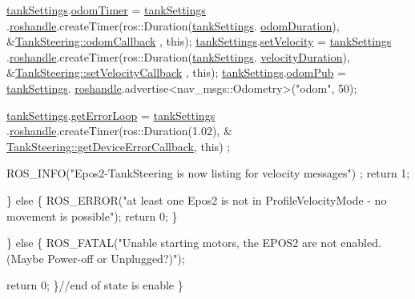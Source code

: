 \begin{DoxyCode}
            \hyperlink{classTankSteering_a6973af1afc00c9b11f32ecc7ad7e8a14}{tankSettings}.\hyperlink{structTankSteering_1_1tankSet_aa0c689559cc4b8217b66d752ed9c5514}{odomTimer} = \hyperlink{classTankSteering_a6973af1afc00c9b11f32ecc7ad7e8a14}{tankSettings}
      .\hyperlink{structTankSteering_1_1tankSet_a56100d71c75a60b1bee858cac36bd28b}{roshandle}.createTimer(ros::Duration(\hyperlink{classTankSteering_a6973af1afc00c9b11f32ecc7ad7e8a14}{tankSettings}.
      \hyperlink{structTankSteering_1_1tankSet_a9bef02225da9845d32bf5700ef132aba}{odomDuration}), &\hyperlink{classTankSteering_ae19dbe86e3ae541c06525af2721a37dd}{TankSteering::odomCallback}
      , \textcolor{keyword}{this});
            \hyperlink{classTankSteering_a6973af1afc00c9b11f32ecc7ad7e8a14}{tankSettings}.\hyperlink{structTankSteering_1_1tankSet_acbbb0676b14d02706ad100abee4a22c8}{setVelocity} = \hyperlink{classTankSteering_a6973af1afc00c9b11f32ecc7ad7e8a14}{tankSettings}
      .\hyperlink{structTankSteering_1_1tankSet_a56100d71c75a60b1bee858cac36bd28b}{roshandle}.createTimer(ros::Duration(\hyperlink{classTankSteering_a6973af1afc00c9b11f32ecc7ad7e8a14}{tankSettings}.
      \hyperlink{structTankSteering_1_1tankSet_a30ffc7283de96cfdf97cd987de2cad63}{velocityDuration}), &\hyperlink{classTankSteering_ab1335cf95b773d0b8908d74ebb61c289}{TankSteering::setVelocityCallback}
      , \textcolor{keyword}{this});
            \hyperlink{classTankSteering_a6973af1afc00c9b11f32ecc7ad7e8a14}{tankSettings}.\hyperlink{structTankSteering_1_1tankSet_a49304224faeac566fc964cbc98135499}{odomPub} = \hyperlink{classTankSteering_a6973af1afc00c9b11f32ecc7ad7e8a14}{tankSettings}.
      \hyperlink{structTankSteering_1_1tankSet_a56100d71c75a60b1bee858cac36bd28b}{roshandle}.advertise<nav\_msgs::Odometry>(\textcolor{stringliteral}{"odom"}, 50);

            \hyperlink{classTankSteering_a6973af1afc00c9b11f32ecc7ad7e8a14}{tankSettings}.\hyperlink{structTankSteering_1_1tankSet_a729f2d8c93ceca1feee6dd6c7680e85a}{getErrorLoop} = \hyperlink{classTankSteering_a6973af1afc00c9b11f32ecc7ad7e8a14}{tankSettings}
      .\hyperlink{structTankSteering_1_1tankSet_a56100d71c75a60b1bee858cac36bd28b}{roshandle}.createTimer(ros::Duration(1.02), &
      \hyperlink{classTankSteering_aed4cd5e319cd5c9cd95b835f1615eb0d}{TankSteering::getDeviceErrorCallback}, \textcolor{keyword}{this})
      ;

            ROS\_INFO(\textcolor{stringliteral}{"Epos2-TankSteering is now listing for velocity messages"})
      ;
            \textcolor{keywordflow}{return} 1;

        \} \textcolor{keywordflow}{else} \{
            ROS\_ERROR(\textcolor{stringliteral}{"at least one Epos2 is not in ProfileVelocityMode - no
       movement is possible"});
            \textcolor{keywordflow}{return} 0;
        \}

    \} \textcolor{keywordflow}{else} \{
        ROS\_FATAL(\textcolor{stringliteral}{"Unable starting motors, the EPOS2 are not enabled. (Maybe
       Power-off or Unplugged?)"});

        \textcolor{keywordflow}{return} 0;
    \}\textcolor{comment}{//end of state is enable}
\}
\end{DoxyCode}
